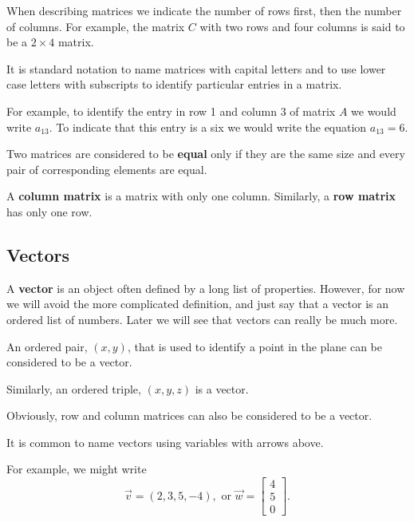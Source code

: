 When describing matrices we indicate the number of rows first, then the number of columns.
For example, the matrix $C$ with two rows and four columns is said to be a $2\times 4$
matrix.



It is standard notation to name matrices with capital letters and to use lower case
letters with subscripts to identify particular entries in a matrix.



For example, to identify the entry in row 1 and column 3 of matrix $A$ we would write $a
_{13}$. To indicate that this entry is a six we would write the equation $a _{13}=6$.



Two matrices are considered to be \textbf{equal} only if they are the same size and every
pair of corresponding elements are equal.



A \textbf{column matrix} is a matrix with only one column. Similarly, a \textbf{row
matrix} has only one row.




\subsection{Vectors}
\label{sss:vect-984f}




A \textbf{vector} is an object often defined by a long list of properties. However, for
now we will avoid the more complicated definition, and just say that a vector is an
ordered list of numbers. Later we will see that vectors can really be much more.



An ordered pair, $(x, y)$, that is used to identify a point in the plane can be considered
to be a vector.



Similarly, an ordered triple, $(x, y, z)$ is a vector.



Obviously, row and column matrices can also be considered to be a vector.



It is common to name vectors using variables with arrows above.



For example, we might write 
\[
\vec{v}=(2, 3, 5, -4),\text{ or } \vec{w}= \begin{bmatrix} 4 \\  5 \\ 0 \end{bmatrix}.
\]


